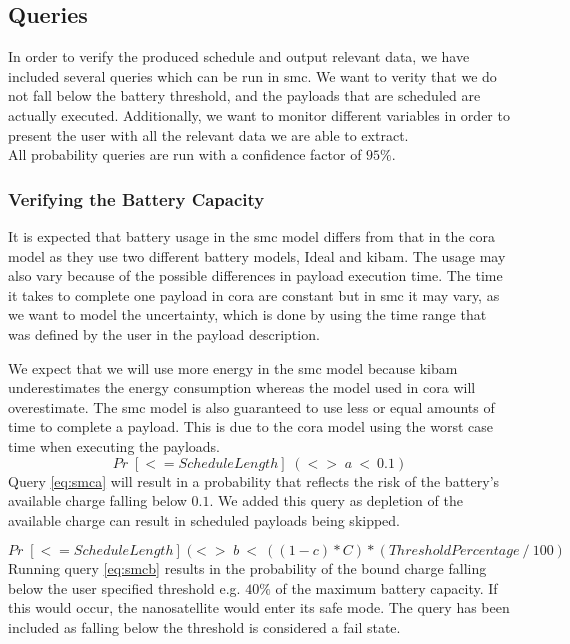 \subsection{Queries} \label{sec:queries}
In order to verify the produced schedule and output relevant data, we have included several queries which can be run in \gls{smc}.
We want to verity that we do not fall below the battery threshold, and the payloads that are scheduled are actually executed.
Additionally, we want to monitor different variables in order to present the user with all the relevant data we are able to extract.\\
All probability queries are run with a confidence factor of $95\%$.

\subsubsection*{Verifying the Battery Capacity}
It is expected that battery usage in the \gls{smc} model differs from that in the \gls{cora} model as they use two different battery models, Ideal and \gls{kibam}.
The usage may also vary because of the possible differences in payload execution time.
The time it takes to complete one payload in \gls{cora} are constant but in \gls{smc} it may vary, as we want to model the uncertainty, which is done by using the time range that was defined by the user in the payload description.

We expect that we will use more energy in the \gls{smc} model because \gls{kibam} underestimates the energy consumption whereas the model used in \gls{cora} will overestimate.
The \gls{smc} model is also guaranteed to use less or equal amounts of time to complete a payload.
This is due to the \gls{cora} model using the worst case time when executing the payloads.
\begin{equation} \label{eq:smca}
	Pr\; [<=ScheduleLength] \; (<>\; a\ <\ 0.1)
\end{equation}
Query \ref{eq:smca} will result in a probability that reflects the risk of the battery's available charge falling below $0.1$.
We added this query as depletion of the available charge can result in scheduled payloads being skipped.

\begin{equation} \label{eq:smcb}
	Pr\; [<=ScheduleLength] \; (<>\; b\ <\ ((1-c)*C) * (ThresholdPercentage\ /\ 100)
\end{equation}
Running query \ref{eq:smcb} results in the probability of the bound charge falling below the user specified threshold e.g. $40\%$ of the maximum battery capacity.
If this would occur, the nanosatellite would enter its safe mode.
The query has been included as falling below the threshold is considered a fail state.

